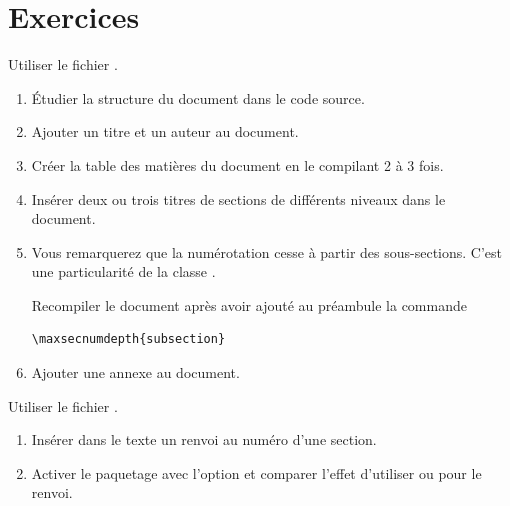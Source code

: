 
\section{Exercices}
\label{sec:construction:exercices}

\begin{exercice}[nosol]
  Utiliser le fichier .
  \begin{enumerate}
  \item Étudier la structure du document dans le code source.
  \item Ajouter un titre et un auteur au document.
  \item Créer la table des matières du document en le compilant 2 à 3
    fois.
  \item Insérer deux ou trois titres de sections de différents niveaux
    dans le document.
  \item Vous remarquerez que la numérotation cesse à partir des
    sous-sections. C'est une particularité de la classe
    .

    Recompiler le document après avoir ajouté au préambule la commande
\begin{lstlisting}
\maxsecnumdepth{subsection}
\end{lstlisting}
  \item Ajouter une annexe au document.
  \end{enumerate}
\end{exercice}

\begin{exercice}[nosol]
  Utiliser le fichier .
  \begin{enumerate}
  \item Insérer dans le texte un renvoi au numéro d'une section.
  \item Activer le paquetage  avec l'option
     et comparer l'effet d'utiliser \cmd{\ref} ou
    \cmd{\autoref} pour le renvoi.
  \end{enumerate}
\end{exercice}


